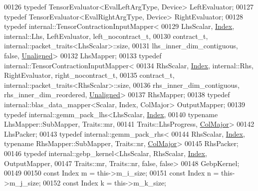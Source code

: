 \begin{DoxyCode}
00126     \textcolor{keyword}{typedef} TensorEvaluator<EvalLeftArgType, Device> LeftEvaluator;
00127     \textcolor{keyword}{typedef} TensorEvaluator<EvalRightArgType, Device> RightEvaluator;
00128     \textcolor{keyword}{typedef} internal::TensorContractionInputMapper<
00129         LhsScalar, \hyperlink{namespace_eigen_a62e77e0933482dafde8fe197d9a2cfde}{Index}, internal::Lhs, LeftEvaluator, left\_nocontract\_t,
00130         contract\_t, internal::packet\_traits<LhsScalar>::size,
00131         lhs\_inner\_dim\_contiguous, \textcolor{keyword}{false}, \hyperlink{group__enums_gga45fe06e29902b7a2773de05ba27b47a1ac935220b4c844108e183ebe30a4d5204}{Unaligned}>
00132         LhsMapper;
00133     \textcolor{keyword}{typedef} internal::TensorContractionInputMapper<
00134         RhsScalar, \hyperlink{namespace_eigen_a62e77e0933482dafde8fe197d9a2cfde}{Index}, internal::Rhs, RightEvaluator, right\_nocontract\_t,
00135         contract\_t, internal::packet\_traits<RhsScalar>::size,
00136         rhs\_inner\_dim\_contiguous, rhs\_inner\_dim\_reordered, \hyperlink{group__enums_gga45fe06e29902b7a2773de05ba27b47a1ac935220b4c844108e183ebe30a4d5204}{Unaligned}>
00137         RhsMapper;
00138     \textcolor{keyword}{typedef} internal::blas\_data\_mapper<Scalar, Index, ColMajor> OutputMapper;
00139     \textcolor{keyword}{typedef} internal::gemm\_pack\_lhs<LhsScalar, \hyperlink{namespace_eigen_a62e77e0933482dafde8fe197d9a2cfde}{Index},
00140                                     \textcolor{keyword}{typename} LhsMapper::SubMapper, Traits::mr,
00141                                     Traits::LhsProgress, \hyperlink{group__enums_ggaacded1a18ae58b0f554751f6cdf9eb13a0cbd4bdd0abcfc0224c5fcb5e4f6669a}{ColMajor}>
00142         LhsPacker;
00143     \textcolor{keyword}{typedef} internal::gemm\_pack\_rhs<
00144         RhsScalar, \hyperlink{namespace_eigen_a62e77e0933482dafde8fe197d9a2cfde}{Index}, \textcolor{keyword}{typename} RhsMapper::SubMapper, Traits::nr, 
      \hyperlink{group__enums_ggaacded1a18ae58b0f554751f6cdf9eb13a0cbd4bdd0abcfc0224c5fcb5e4f6669a}{ColMajor}>
00145         RhsPacker;
00146     \textcolor{keyword}{typedef} internal::gebp\_kernel<LhsScalar, RhsScalar, \hyperlink{namespace_eigen_a62e77e0933482dafde8fe197d9a2cfde}{Index}, OutputMapper,
00147                                   Traits::mr, Traits::nr, \textcolor{keyword}{false}, \textcolor{keyword}{false}>
00148         GebpKernel;
00149 
00150     \textcolor{keyword}{const} Index m = this->m\_i\_size;
00151     \textcolor{keyword}{const} Index n = this->m\_j\_size;
00152     \textcolor{keyword}{const} Index k = this->m\_k\_size;

\end{DoxyCode}
